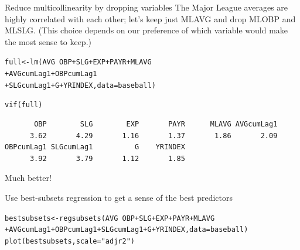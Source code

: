 \documentclass{beamer}\usepackage[]{graphicx}\usepackage[]{color}
\makeatletter
\newcommand{\hlstr}[1]{\textcolor[rgb]{1,0.894,0.71}{#1}}%
\newcommand{\hlopt}[1]{\textcolor[rgb]{1,0.894,0.769}{#1}}%
\newcommand{\hlstd}[1]{\textcolor[rgb]{1,0.894,0.769}{#1}}%
\newcommand{\hlkwb}[1]{\textcolor[rgb]{0.804,0.776,0.451}{#1}}%
\newcommand{\hlkwc}[1]{\textcolor[rgb]{0.78,0.941,0.545}{#1}}%
\newcommand{\hlkwd}[1]{\textcolor[rgb]{1,0.78,0.769}{#1}}%
\newenvironment{kframe}{%
 \def\at@end@of@kframe{}%
 \ifinner\ifhmode%
  \def\at@end@of@kframe{\end{minipage}}%
  \begin{minipage}{\columnwidth}%
 \fi\fi%
 \def\FrameCommand##1{\hskip\@totalleftmargin \hskip-\fboxsep
 \colorbox{shadecolor}{##1}\hskip-\fboxsep
     \hskip-\linewidth \hskip-\@totalleftmargin \hskip\columnwidth}%
 \MakeFramed {\advance\hsize-\width
   \@totalleftmargin\z@ \linewidth\hsize
   \@setminipage}}%
 {\par\unskip\endMakeFramed%
 \at@end@of@kframe}
\newenvironment{knitrout}{}{} %
\makeatother
\begin{document}
\begin{darkframes}
    \begin{frame}[fragile]{Reduce multicollinearity by dropping variables}
      The Major League averages are highly correlated with each other; 
      let's keep just MLAVG and drop MLOBP and MLSLG. (This choice depends on our preference of which
      variable would make the most sense to keep.)

      \fontsize{9}{9}\selectfont
\begin{knitrout}
\begin{kframe}
\begin{alltt}
\hlstd{full} \hlkwb{<-} \hlkwd{lm}\hlstd{(AVG} \hlopt{~} \hlstd{OBP} \hlopt{+} \hlstd{SLG} \hlopt{+} \hlstd{EXP} \hlopt{+} \hlstd{PAYR} \hlopt{+} \hlstd{MLAVG}
                  \hlopt{+} \hlstd{AVGcumLag1} \hlopt{+} \hlstd{OBPcumLag1}
                  \hlopt{+} \hlstd{SLGcumLag1} \hlopt{+} \hlstd{G} \hlopt{+} \hlstd{YRINDEX,} \hlkwc{data}\hlstd{=baseball)}

\hlkwd{vif}\hlstd{(full)}
\end{alltt}
\begin{verbatim}
       OBP        SLG        EXP       PAYR      MLAVG AVGcumLag1 
      3.62       4.29       1.16       1.37       1.86       2.09 
OBPcumLag1 SLGcumLag1          G    YRINDEX 
      3.92       3.79       1.12       1.85 
\end{verbatim}
\end{kframe}
\end{knitrout}

      {Much better!}
    \end{frame}


    \begin{frame}[fragile]{Use best-subsets regression to get a sense of the best predictors}
      \fontsize{9}{9}\selectfont 

\begin{knitrout}
\begin{kframe}
\begin{alltt}
\hlstd{bestsubsets} \hlkwb{<-} \hlkwd{regsubsets}\hlstd{(AVG} \hlopt{~} \hlstd{OBP} \hlopt{+} \hlstd{SLG} \hlopt{+} \hlstd{EXP} \hlopt{+} \hlstd{PAYR} \hlopt{+} \hlstd{MLAVG}
  \hlopt{+} \hlstd{AVGcumLag1} \hlopt{+} \hlstd{OBPcumLag1} \hlopt{+} \hlstd{SLGcumLag1} \hlopt{+} \hlstd{G} \hlopt{+} \hlstd{YRINDEX,} \hlkwc{data}\hlstd{=baseball)}
\hlkwd{plot}\hlstd{(bestsubsets,} \hlkwc{scale}\hlstd{=}\hlstr{"adjr2"}\hlstd{)}
\end{alltt}
\end{kframe}
\end{knitrout}


\end{frame}
\end{darkframes}
\end{document}
